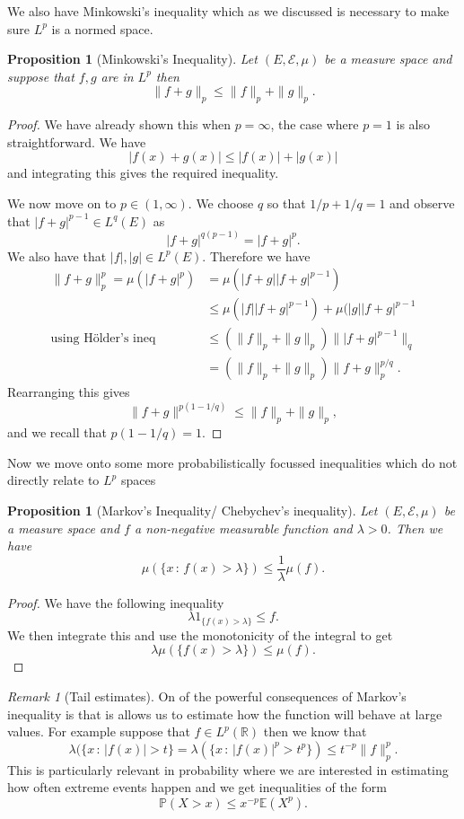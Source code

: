 \documentclass[11pt]{article}
\newtheorem{prp}[thm]{Proposition}
\theoremstyle{definition}
\theoremstyle{remark}
\newtheorem{remark}[thm]{Remark}
\begin{document}
We also have Minkowski's inequality which as we discussed is necessary to make sure $L^p$ is a normed space.

\begin{prp}[Minkowski's Inequality]
Let $(E, \mathcal{E}, \mu)$ be a measure space and suppose that $f,g$ are in $L^p$ then 
\[ \|f+g\|_p \leq \|f\|_p + \|g \|_p. \]
\end{prp}
\begin{proof}
We have already shown this when $p=\infty$, the case where $p=1$ is also straightforward. We have
\[ |f(x) + g(x)| \leq |f(x)| + |g(x)| \] and integrating this gives the required inequality.

We now move on to $p \in (1, \infty)$. We choose $q$ so that $1/p + 1/q  = 1$ and observe that $|f + g|^{p-1} \in L^q(E)$ as
\[ |f+g|^{q(p-1)}= |f+g|^p. \] We also have that $|f|,|g| \in L^p(E)$. Therefore we have
\begin{align*}\|f+g\|_p^p = \mu(|f+g|^p) &= \mu(|f+g| |f+g|^{p-1}) \\
& \leq \mu(|f| |f+g|^{p-1}) + \mu (|g| |f+g|^{p-1} \\
\mbox{using H\"older's ineq} \quad & \leq \left( \|f\|_p + \|g\|_p\right) \| |f+g|^{p-1}\|_q \\
&= \left( \|f\|_p + \|g\|_p \right) \|f+g\|_p^{p/q}.
\end{align*} Rearranging this gives
\[ \|f+g\|^{p(1-1/q)} \leq \|f\|_p + \|g\|_p, \] and we recall that $p(1-1/q) = 1$.
\end{proof}

Now we move onto some more probabilistically focussed inequalities which do not directly relate to $L^p$ spaces
\begin{prp}[Markov's Inequality/ Chebychev's inequality]
Let $(E, \mathcal{E}, \mu)$ be a measure space and $f$ a non-negative measurable function and $\lambda>0$. Then we have
\[ \mu(\{ x\,:\, f(x) > \lambda\}) \leq \frac{1}{\lambda} \mu(f). \]
\end{prp}
\begin{proof}
We have the following inequality \[ \lambda 1_{\{ f(x) > \lambda\}} \leq f. \] We then integrate this and use the monotonicity of the integral to get
\[ \lambda \mu(\{ f(x) > \lambda\}) \leq \mu(f). \]
\end{proof}

\begin{remark}[Tail estimates]
On of the powerful consequences of Markov's inequality is that is allows us to estimate how the function will behave at large values. For example suppose that $f \in L^p(\mathbb{R})$ then we know that
\[ \lambda(\{ x\, :\, |f(x)| > t \} = \lambda (\{ x\,:\, |f(x)|^p > t^p\}) \leq t^{-p} \|f\|_p^p.\]
This is particularly relevant in probability where we are interested in estimating how often extreme events happen and we get inequalities of the form
\[ \mathbb{P}(X > x) \leq x^{-p}\mathbb{E}(X^p). \]
\end{remark}
\end{document}
